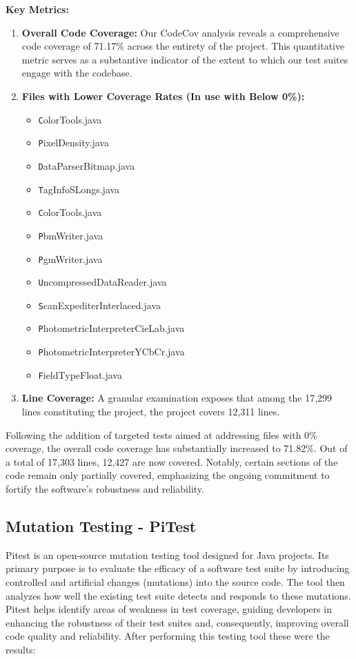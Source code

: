 \documentclass[sigconf]{acmart}
\begin{document}
\textbf{Key Metrics:}
\begin{enumerate}
    \item \textbf{Overall Code Coverage:} Our CodeCov analysis reveals a comprehensive code coverage of 71.17\% across the entirety of the project. This quantitative metric serves as a substantive indicator of the extent to which our test suites engage with the codebase.
    
    \item \textbf{Files with Lower Coverage Rates (In use with Below 0\%):}
    \begin{itemize}
        \item \texttt ColorTools.java
        \item \texttt PixelDensity.java
        \item \texttt DataParserBitmap.java
        \item \texttt TagInfoSLongs.java
        \item \texttt ColorTools.java
        \item \texttt PbmWriter.java
        \item \texttt PgmWriter.java
        \item \texttt UncompressedDataReader.java
        \item \texttt ScanExpediterInterlaced.java
        \item \texttt PhotometricInterpreterCieLab.java
        \item \texttt PhotometricInterpreterYCbCr.java
        \item \texttt FieldTypeFloat.java
    \end{itemize}
    
    \item \textbf{Line Coverage:} A granular examination exposes that among the 17,299 lines constituting the project, the project covers 12,311 lines.
\end{enumerate}

Following the addition of targeted tests aimed at addressing files with 0\% coverage, the overall code coverage has substantially increased to 71.82\%. Out of a total of 17,303 lines, 12,427 are now covered. Notably, certain sections of the code remain only partially covered, emphasizing the ongoing commitment to fortify the software's robustness and reliability.


\subsection{Mutation Testing - PiTest}
Pitest \cite{pitest} is an open-source mutation testing tool designed for Java projects. Its primary purpose is to evaluate the efficacy of a software test suite by introducing controlled and artificial changes (mutations) into the source code. The tool then analyzes how well the existing test suite detects and responds to these mutations. Pitest helps identify areas of weakness in test coverage, guiding developers in enhancing the robustness of their test suites and, consequently, improving overall code quality and reliability. 
After performing this testing tool these were the results:
\end{document}
